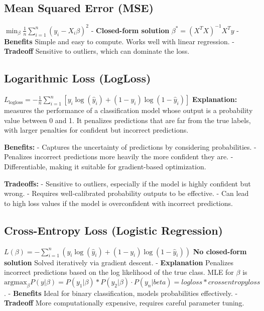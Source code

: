 \documentclass[10pt]{article}
\begin{document}
\begin{multicols}{2}
\subsection*{Mean Squared Error (MSE)}
$\min_{\beta} \frac{1}{n} \sum_{i=1}^{n} (y_i - X_i\beta)^2$
- \textbf{Closed-form solution} $\beta^* = (X^TX)^{-1}X^Ty$
- \textbf{Benefits} Simple and easy to compute. Works well with linear regression.
- \textbf{Tradeoff} Sensitive to outliers, which can dominate the loss.



\subsection*{Logarithmic Loss (LogLoss)}

$L_{\text{logloss}} = -\frac{1}{n} \sum_{i=1}^{n} \left[ y_i \log(\hat{y}_i) + (1 - y_i) \log(1 - \hat{y}_i) \right]$
\textbf{Explanation:} measures the performance of a classification model whose output is a probability value between 0 and 1. It penalizes predictions that are far from the true labels, with larger penalties for confident but incorrect predictions.

\textbf{Benefits:}
- Captures the uncertainty of predictions by considering probabilities.
- Penalizes incorrect predictions more heavily the more confident they are.
- Differentiable, making it suitable for gradient-based optimization.

\textbf{Tradeoffs:}
- Sensitive to outliers, especially if the model is highly confident but wrong.
- Requires well-calibrated probability outputs to be effective.
- Can lead to high loss values if the model is overconfident with incorrect predictions.


\subsection*{Cross-Entropy Loss (Logistic Regression)}
$L(\beta) = - \sum_{i=1}^{n} \left(y_i \log(\hat{y}_i) + (1 - y_i) \log(1 - \hat{y}_i)\right)$
\textbf{No closed-form solution} Solved iteratively via gradient descent.
- \textbf{Explanation} Penalizes incorrect predictions based on the log likelihood of the true class. MLE for $\beta$ is $\text{argmax}_{\beta} P(y|\beta) = P(y_1|\beta) * P(y_2|\beta)\cdot P(y_n|beta) = log loss * cross entropy loss$.
- \textbf{Benefits} Ideal for binary classification, models probabilities effectively.
- \textbf{Tradeoff} More computationally expensive, requires careful parameter tuning.


\end{multicols}
\end{document}
